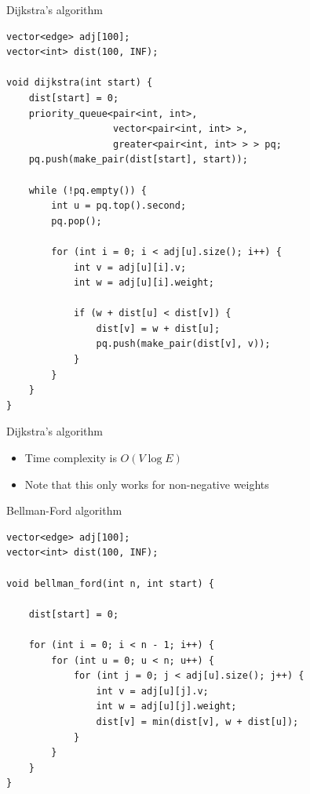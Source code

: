 \documentclass{beamer}
\begin{document}
\begin{frame}{Dijkstra's algorithm}
    \tiny
    \begin{verbatim}
vector<edge> adj[100];
vector<int> dist(100, INF);

void dijkstra(int start) {
    dist[start] = 0;
    priority_queue<pair<int, int>,
                   vector<pair<int, int> >,
                   greater<pair<int, int> > > pq;
    pq.push(make_pair(dist[start], start));

    while (!pq.empty()) {
        int u = pq.top().second;
        pq.pop();

        for (int i = 0; i < adj[u].size(); i++) {
            int v = adj[u][i].v;
            int w = adj[u][i].weight;

            if (w + dist[u] < dist[v]) {
                dist[v] = w + dist[u];
                pq.push(make_pair(dist[v], v));
            }
        }
    }
}
    \end{verbatim}
\end{frame}

\begin{frame}[plain]{Dijkstra's algorithm}
    \begin{itemize}
        \item Time complexity is $O(V \log E)$
        \vspace{10pt}
        \item Note that this only works for non-negative weights
    \end{itemize}
\end{frame}

\begin{frame}{Bellman-Ford algorithm}
    \begin{verbatim}
vector<edge> adj[100];
vector<int> dist(100, INF);

void bellman_ford(int n, int start) {

    dist[start] = 0;

    for (int i = 0; i < n - 1; i++) {
        for (int u = 0; u < n; u++) {
            for (int j = 0; j < adj[u].size(); j++) {
                int v = adj[u][j].v;
                int w = adj[u][j].weight;
                dist[v] = min(dist[v], w + dist[u]);
            }
        }
    }
}
    \end{verbatim}
\end{frame}
\end{document}
